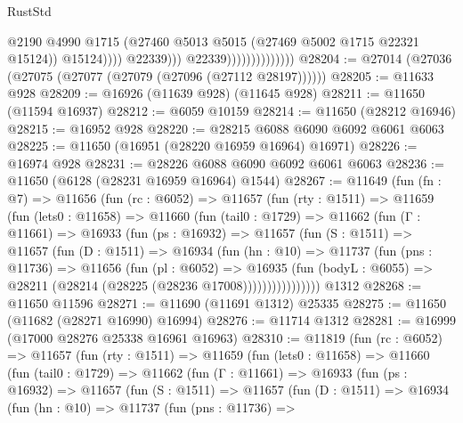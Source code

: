 \begin{lexlean}{RustStd}
\begin{coremodule}
                                              @2190
                                              @4990
                                              @1715
                                              (@27460
                                                @5013
                                                @5015
                                                (@27469 @5002 @1715 @22321 @15124))
                                              @15124))))
                                      @22339)))
                                @22339))))))))))))))
@28204 := @27014 (@27036 (@27075 (@27077 (@27079 (@27096 (@27112 @28197))))))
@28205 := @11633 @928
@28209 := @16926 (@11639 @928) (@11645 @928)
@28211 := @11650 (@11594 @16937)
@28212 := @6059 @10159
@28214 := @11650 (@28212 @16946)
@28215 := @16952 @928
@28220 := @28215 @6088 @6090 @6092 @6061 @6063
@28225 := @11650 (@16951 (@28220 @16959 @16964) @16971)
@28226 := @16974 @928
@28231 := @28226 @6088 @6090 @6092 @6061 @6063
@28236 := @11650 (@6128 (@28231 @16959 @16964) @1544)
@28267 := @11649
    (fun (fn : @7) =>
    @11656
      (fun (rc : @6052) =>
      @11657
        (fun (rty : @1511) =>
        @11659
          (fun (lets0 : @11658) =>
          @11660
            (fun (tail0 : @1729) =>
            @11662
              (fun (Γ : @11661) =>
              @16933
                (fun (ps : @16932) =>
                @11657
                  (fun (S : @1511) =>
                  @11657
                    (fun (D : @1511) =>
                    @16934
                      (fun (hn : @10) =>
                      @11737
                        (fun (pns : @11736) =>
                        @11656
                          (fun (pl : @6052) =>
                          @16935
                            (fun (bodyL : @6055) =>
                            @28211 (@28214 (@28225 (@28236 @17008))))))))))))))))
    @1312
@28268 := @11650 @11596
@28271 := @11690 (@11691 @1312) @25335
@28275 := @11650 (@11682 (@28271 @16990) @16994)
@28276 := @11714 @1312
@28281 := @16999 (@17000 @28276 @25338 @16961 @16963)
@28310 := @11819
    (fun (rc : @6052) =>
    @11657
      (fun (rty : @1511) =>
      @11659
        (fun (lets0 : @11658) =>
        @11660
          (fun (tail0 : @1729) =>
          @11662
            (fun (Γ : @11661) =>
            @16933
              (fun (ps : @16932) =>
              @11657
                (fun (S : @1511) =>
                @11657
                  (fun (D : @1511) =>
                  @16934
                    (fun (hn : @10) =>
                    @11737
                      (fun (pns : @11736) =>

\end{coremodule}
\end{lexlean}
